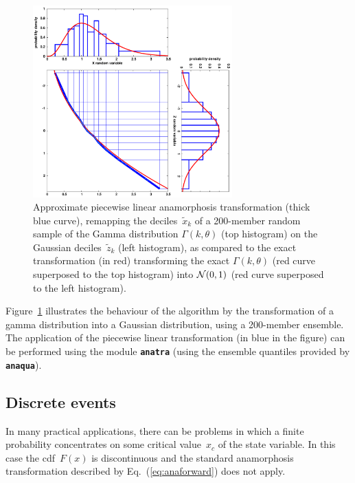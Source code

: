 \documentclass[11pt]{article}
\begin{document}
\begin{figure}[htbp]
\centerline{
\includegraphics[width=0.685\textwidth]{Figures/ensanam_general_scheme.pdf}
}
\caption{Approximate piecewise linear anamorphosis transformation
(thick blue curve), remapping the deciles~$\tilde{x}_k$
of a 200-member random sample of the Gamma distribution $\Gamma(k,\theta)$
(top histogram) on the Gaussian deciles~$\tilde{z}_k$ (left histogram),
as compared to the exact transformation (in red) transforming the exact
$\Gamma(k,\theta)$ (red curve superposed to the top histogram)
into ${\cal N}(0,1)$ (red curve superposed to the left histogram).
\label{fig:anascheme}}
\end{figure}

Figure~\ref{fig:anascheme} illustrates the behaviour of the algorithm by the transformation
of a gamma distribution into a Gaussian distribution, using a 200-member ensemble.
The application of the piecewise linear transformation (in blue in the figure)
can be performed using the module {\tt\bf anatra}
(using the ensemble quantiles provided by {\tt\bf anaqua}).

\subsection{Discrete events}
\label{sec:discrete}

In many practical applications, there can be problems in which a finite probability
concentrates on some critical value~$x_c$ of the state variable.
In this case the cdf~$F(x)$ is discontinuous and the standard anamorphosis transformation
described by Eq.~(\ref{eq:anaforward}) does not apply.
\end{document}
